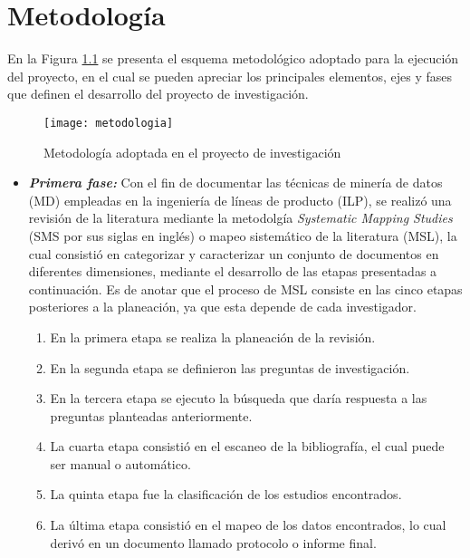 \chapter{Metodología}



En la Figura \ref{metodologia} se presenta el esquema metodológico adoptado para la ejecución del proyecto, en el cual se pueden apreciar los principales elementos, ejes y fases que definen el desarrollo del proyecto de investigación.
\begin{figure}[ht]
\centering
\texttt{[image: metodologia]}
\caption{Metodología adoptada en el proyecto de investigación}
\label{metodologia}
\end{figure}


\begin{itemize}

\item \textbf{\textit{Primera fase:}} Con el fin de documentar las técnicas de minería de datos (MD) empleadas en la ingeniería de líneas de producto (ILP), se realizó una revisión de la literatura mediante la metodolgía \textit{Systematic Mapping Studies} (SMS por sus siglas en inglés) o mapeo sistemático de la literatura (MSL),  la cual consistió en categorizar y caracterizar un conjunto de documentos en diferentes dimensiones, mediante el  desarrollo de las etapas presentadas a continuación. Es de anotar que el proceso de MSL consiste en las cinco etapas posteriores a la planeación, ya que esta depende de cada investigador. 


\begin{enumerate}
\item En la primera etapa se realiza la planeación de la revisión.
\item En la segunda etapa se definieron las preguntas de investigación.
\item En la tercera etapa se ejecuto la búsqueda que daría respuesta a las preguntas planteadas anteriormente.
\item La cuarta etapa consistió en el escaneo de la bibliografía, el cual puede ser manual o automático.
\item La quinta etapa fue la clasificación de los estudios encontrados. 
\item La última etapa consistió en el mapeo de los datos encontrados, lo cual derivó en un documento llamado protocolo o informe final.
\end{enumerate}


\end{itemize}
